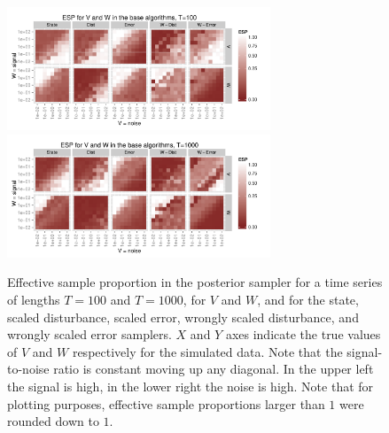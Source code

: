 \documentclass{article}
\begin{document}
\begin{figure}[!ht]
\centering
\includegraphics[width=0.7\textwidth]{baseESplot1}
\includegraphics[width=0.7\textwidth]{baseESplot2}
\caption{Effective sample proportion in the posterior sampler for a time series of lengths $T=100$ and $T=1000$, for $V$ and $W$, and for the state, scaled disturbance, scaled error, wrongly scaled disturbance, and wrongly scaled error samplers. $X$ and $Y$ axes indicate the true values of $V$ and $W$ respectively for the simulated data. Note that the signal-to-noise ratio is constant moving up any diagonal. In the upper left the signal is high, in the lower right the noise is high. Note that for plotting purposes, effective sample proportions larger than $1$ were rounded down to $1$.}
\label{baseESplot}
\end{figure}
\end{document}
